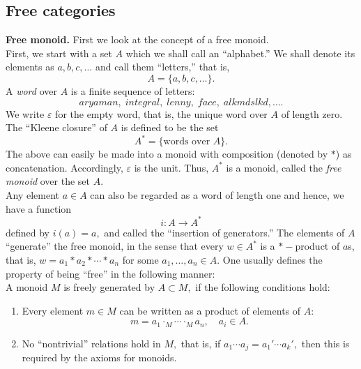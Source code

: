 \subsection{Free categories}
\textbf{Free monoid.} First we look at the concept of a free monoid.\\
First, we start with a set $A$ which we shall call an ``alphabet.'' We shall denote its elements as $a, b, c, \ldots$ and call them ``letters,'' that is,
\begin{equation*} 
	A = \{a, b, c, \ldots\}.
\end{equation*}
A \emph{word} over $A$ is a finite sequence of letters:
\begin{equation*} 
	aryaman,\;integral,\;lenny,\;face,\;alkmdslkd,\ldots.
\end{equation*}
We write $\varepsilon$ for the empty word, that is, the unique word over $A$ of length zero. The ``Kleene closure'' of $A$ is defined to be the set 
\begin{equation*} 
	A^* = \{\text{words over }A\}.
\end{equation*}
The above can easily be made into a monoid with composition (denoted by $*$) as concatenation. Accordingly, $\varepsilon$ is the unit. Thus, $A^*$ is a monoid, called the \emph{free monoid} over the set $A.$\\
Any element $a \in A$ can also be regarded as a word of length one and hence, we have a function
\begin{equation*} 
	i:A \to A^*
\end{equation*}
defined by $i(a) = a,$ and called the ``insertion of generators.'' The elements of $A$ ``generate'' the free monoid, in the sense that every $w \in A^*$ is a $*-$product of $a$s, that is, $w = a_1*a_2*\cdots *a_n$ for some $a_1, \ldots, a_n \in A.$ One usually defines the property of being ``free'' in the following manner:\\
A monoid $M$ is freely generated by $A \subset M,$ if the following conditions hold:
\begin{enumerate}
	\item Every element $m \in M$ can be written as a product of elements of $A:$
	\begin{equation*} 
		m = a_1 \cdot_M \cdots \cdot_M a_n, \quad a_i \in A.
	\end{equation*}
	\item No ``nontrivial'' relations hold in $M,$ that is, if $a_1\cdots a_j = a_1'\cdots a_k',$ then this is required by the axioms for monoids.
\end{enumerate}

